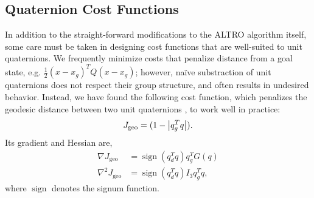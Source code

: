 \documentclass[letterpaper, 10 pt, conference]{ieeeconf}  %
\newcommand{\half}{\frac{1}{2}}
\DeclareMathOperator{\sign}{sign}
\begin{document}
    \subsection{Quaternion Cost Functions} \label{sec:cost_functions}
        In addition to the straight-forward modifications to the ALTRO algorithm itself, some care must be taken in designing cost functions that are well-suited to unit quaternions. We
        frequently minimize costs that penalize distance from a goal state, e.g. $\half
        (x-x_g)^T Q (x-x_g)$; however, na\"ive substraction of unit quaternions does not respect their group structure, and often results in undesired behavior. Instead, we have found the following cost function, which penalizes the geodesic
        distance between two unit quaternions \cite{Kuffner2004}, to work well in practice:
        \begin{equation} \label{eq:quat_geodesic}
            J_\text{geo} = (1-\abs{q_g^T q}) .
        \end{equation}
        Its gradient and Hessian are,
        \begin{align}
            \nabla J_\text{geo} &= \sign(q_d^T q) q_g^T G(q) \\
            \nabla^2 J_\text{geo} &= \sign(q_d^T q) I_3 q_g^T q ,
        \end{align}
        where $\sign$ denotes the signum function.
        
\end{document}
